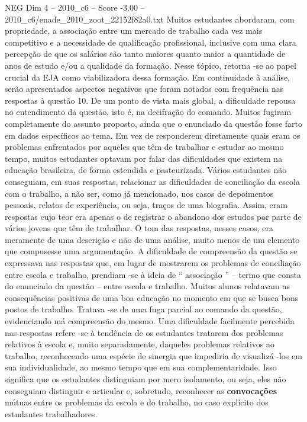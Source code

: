 \begin{textsample}{NEG Dim 4 – 2010\_c6 – Score -3.00 – 2010\_c6/enade\_2010\_zoot\_22152f82a0.txt}
Muitos estudantes abordaram, com propriedade, a associação entre um mercado de trabalho cada vez mais competitivo e a necessidade de qualificação profissional, inclusive com uma clara percepção de que os salários são tanto maiores quanto maior a quantidade de anos de estudo e/ou a qualidade da formação.
Nesse tópico, retorna -se ao papel crucial da EJA como viabilizadora dessa formação.
Em continuidade à análise, serão apresentados aspectos negativos que foram notados com frequência nas respostas à questão 10.
De um ponto de vista mais global, a dificuldade repousa no entendimento da questão, isto é, na decifração do comando.
Muitos fugiram completamente do assunto proposto, ainda que o enunciado da questão fosse farto em dados específicos ao tema.
Em vez de responderem diretamente quais eram os problemas enfrentados por aqueles que têm de trabalhar e estudar ao mesmo tempo, muitos estudantes optavam por falar das dificuldades que existem na educação brasileira, de forma estendida e pasteurizada.
Vários estudantes não conseguiam, em suas respostas, relacionar as dificuldades de conciliação da escola com o trabalho, a não ser, como já mencionado, nos casos de depoimentos pessoais, relatos de experiência, ou seja, traços de uma biografia.
Assim, eram respostas cujo teor era apenas o de registrar o abandono dos estudos por parte de vários jovens que têm de trabalhar.
O tom das respostas, nesses casos, era meramente de uma descrição e não de uma análise, muito menos de um elemento que compusesse uma argumentação.
A dificuldade de compreensão da questão se expressava nas respostas que, em lugar de mostrarem os problemas de conciliação entre escola e trabalho, prendiam -se à ideia de “ associação ” – termo que consta do enunciado da questão – entre escola e trabalho.
Muitos alunos relatavam as consequências positivas de uma boa educação no momento em que se busca bons postos de trabalho.
Tratava -se de uma fuga parcial ao comando da questão, evidenciando má compreensão do mesmo.
Uma dificuldade facilmente percebida nas respostas refere -se à tendência de os estudantes tratarem dos problemas relativos à escola e, muito separadamente, daqueles problemas relativos ao trabalho, reconhecendo uma espécie de sinergia que impediria de visualizá -los em sua individualidade, ao mesmo tempo que em sua complementaridade.
Isso significa que os estudantes distinguiam por mero isolamento, ou seja, eles não conseguiam distinguir e articular e, sobretudo, reconhecer as \textbf{convocações} mútuas entre os problemas da escola e do trabalho, no caso explícito dos estudantes trabalhadores.

\end{textsample}
